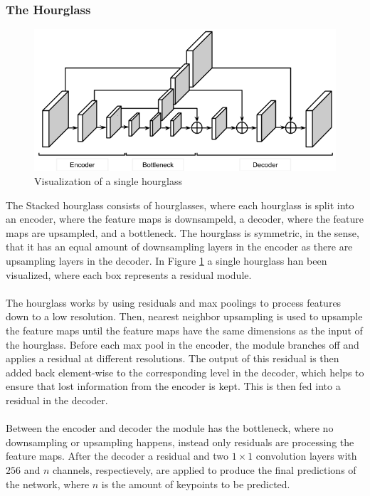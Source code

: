 \documentclass[./main.tex]{subfiles}
\begin{document}
\subsubsection{The Hourglass}
\begin{figure}[htbp]
    \centering
    \includegraphics[width = 12 cm]{entities/Hourglass.png}
    \caption{Visualization of a single hourglass \cite{Newell}}
    \label{fig:hourglass}
\end{figure}
\noindent The Stacked hourglass consists of hourglasses, where each hourglass is split into an encoder, where the feature maps is downsampeld, a decoder, where the feature maps are upsampled, and a bottleneck. The hourglass is symmetric, in the sense, that it has an equal amount of downsampling layers in the encoder as there are upsampling layers in the decoder. In Figure \ref{fig:hourglass} a single hourglass han been visualized, where each box represents a residual module.
\\
\\
The hourglass works by using residuals and max poolings to process features down to a low resolution. Then, nearest neighbor upsampling is used to upsample the feature maps until the feature maps have the same dimensions as the input of the hourglass. Before each max pool in the encoder, the module branches off and applies a residual at different resolutions. The output of this residual is then added back element-wise to the corresponding level in the decoder, which helps to ensure that lost information from the encoder is kept. This is then fed into a residual in the decoder.
\\
\\
Between the encoder and decoder the module has the bottleneck, where no downsampling or upsampling happens, instead only residuals are processing the feature maps. After the decoder a residual and two $1 \times 1$ convolution layers with $256$ and $n$ channels, respectievely, are applied to produce the final predictions of the network, where $n$ is the amount of keypoints to be predicted.
\end{document}
